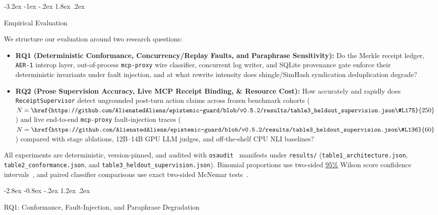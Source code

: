\documentclass[10pt,twocolumn]{article}
\makeatletter
\renewcommand\section{\@startsection{section}{1}{\z@}%
  {-3.2ex \@plus -1ex \@minus -.2ex}%
  {1.8ex \@plus .2ex}%
  {\normalfont\Large\bfseries\raggedright}}
\renewcommand\subsection{\@startsection{subsection}{2}{\z@}%
  {-2.8ex \@plus -0.8ex \@minus -.2ex}%
  {1.2ex \@plus .2ex}%
  {\normalfont\large\bfseries\raggedright}}
\makeatother
\begin{document}
\section{Empirical Evaluation}
\label{sec:eval}

We structure our evaluation around two research questions:
\begin{itemize}
  \item \textbf{RQ1 (Deterministic Conformance, Concurrency/Replay Faults, and Paraphrase Sensitivity):} Do the Merkle receipt ledger, \texttt{AER-1} interop layer, out-of-process \texttt{mcp-proxy} wire classifier, concurrent log writer, and SQLite provenance gate enforce their deterministic invariants under fault injection, and at what rewrite intensity does shingle/SimHash syndication deduplication degrade?
  \item \textbf{RQ2 (Prose Supervision Accuracy, Live MCP Receipt Binding, \& Resource Cost):} How accurately and rapidly does \texttt{ReceiptSupervisor} detect ungrounded post-turn action claims across frozen benchmark cohorts ($N=\href{https://github.com/AlienatedAliens/epistemic-guard/blob/v0.5.2/results/table3_heldout_supervision.json\#L175}{250}$) and live end-to-end \texttt{mcp-proxy} fault-injection traces ($N=\href{https://github.com/AlienatedAliens/epistemic-guard/blob/v0.5.2/results/table3_heldout_supervision.json\#L136}{60}$) compared with stage ablations, 12B--14B GPU LLM judges, and off-the-shelf CPU NLI baselines?
\end{itemize}

All experiments are deterministic, version-pinned, and audited with \texttt{osaudit}~\cite{monperrus2026osaudit} manifests under \texttt{results/} (\texttt{table1\_\allowbreak architecture.json}, \texttt{table2\_\allowbreak conformance.json}, and \texttt{table3\_\allowbreak heldout\_\allowbreak supervision.json}). Binomial proportions use two-sided \href{https://github.com/AlienatedAliens/epistemic-guard/blob/v0.5.2/osaudit.toml}{95\%} Wilson score confidence intervals~\cite{wilson1927probable}, and paired classifier comparisons use exact two-sided McNemar tests~\cite{mcnemar1947note}.

\subsection{RQ1: Conformance, Fault-Injection, and Paraphrase Degradation}
\label{sec:rq1}
\end{document}
